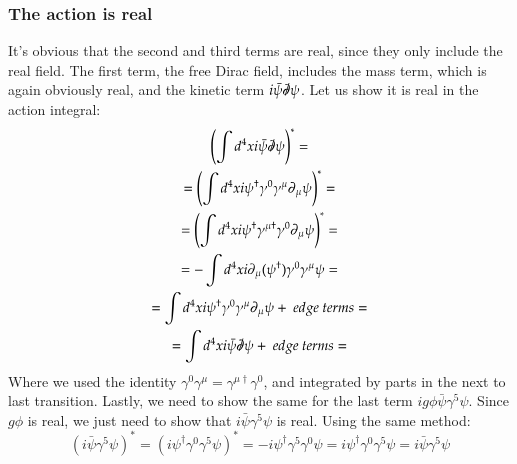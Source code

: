 \documentclass{article}
\begin{document}
\subsubsection{The action is real}
It's obvious that the second and third terms are real, since they only include the real field. The first term, the free Dirac field, includes the mass term, which is again obviously real, and the kinetic term $i\bar{\psi}\slashed{\partial}\psi$. Let us show it is real in the action integral:
\begin{equation}
\begin{gathered}
    \left(\int d^4x i\bar{\psi}\slashed{\partial}\psi\right)^* = 
    \\ =
    \left(\int d^4x i \psi^\dagger \gamma^0 \gamma^\mu \partial_\mu \psi\right)^* = \\ =
    \left(\int d^4x i \psi^\dagger \gamma^{\mu\dagger}\gamma^0 \partial_\mu  \psi\right)^* = \\ =
    - \int d^4x i  \partial_\mu (\psi^\dagger) \gamma^0 \gamma^{\mu} \psi = \\ =
    \int d^4x i \psi^\dagger \gamma^0 \gamma^{\mu} \partial_\mu \psi + \ edge \ terms = \\ =
    \int d^4x i \bar{\psi} \slashed{\partial} \psi + \ edge \ terms =
\end{gathered}
\end{equation}
Where we used the identity $\gamma^0\gamma^\mu = \gamma^{\mu\dagger}\gamma^0$, and integrated by parts in the next to last transition.
\newline
Lastly, we need to show the same for the last term $ig\phi\bar{\psi}\gamma^5\psi$. Since $g\phi$ is real, we just need to show that $i\bar{\psi}\gamma^5\psi$ is real. Using the same method:
\begin{equation}
    (i\bar{\psi}\gamma^5\psi)^* = (i\psi^\dagger\gamma^0\gamma^5\psi)^* = -i\psi^\dagger\gamma^5\gamma^0\psi = i\psi^\dagger\gamma^0\gamma^5\psi = i\bar{\psi}\gamma^5\psi
\end{equation}
\end{document}
